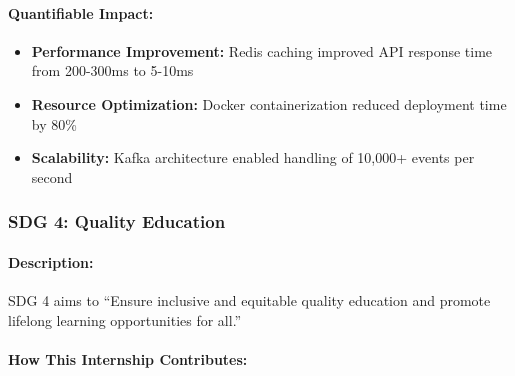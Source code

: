\paragraph{Quantifiable Impact:}
\begin{itemize}
    \item \textbf{Performance Improvement:} Redis caching improved API response time from 200-300ms to 5-10ms
    \item \textbf{Resource Optimization:} Docker containerization reduced deployment time by 80\%
    \item \textbf{Scalability:} Kafka architecture enabled handling of 10,000+ events per second
\end{itemize}

\subsubsection{SDG 4: Quality Education}

\paragraph{Description:}
SDG 4 aims to ``Ensure inclusive and equitable quality education and promote lifelong learning opportunities for all.''

\paragraph{How This Internship Contributes:}

